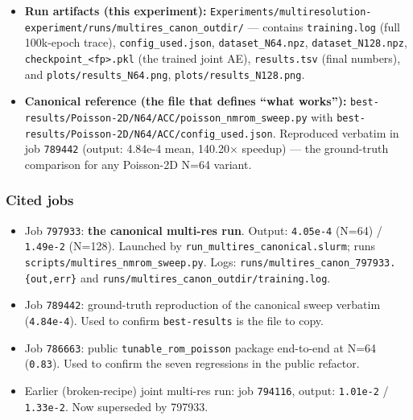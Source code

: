 \begin{itemize}
        $n_{\text{eq}}$=80, min\_eq=300, gn\_tol=1e-6, max\_iters=8).
  \item \textbf{Run artifacts (this experiment):}
        \texttt{Experiments/multiresolution-experiment/runs/multires\_canon\_outdir/}
        --- contains \texttt{training.log} (full 100k-epoch trace),
        \texttt{config\_used.json}, \texttt{dataset\_N64.npz},
        \texttt{dataset\_N128.npz}, \texttt{checkpoint\_<fp>.pkl} (the
        trained joint AE), \texttt{results.tsv} (final numbers), and
        \texttt{plots/results\_N64.png}, \texttt{plots/results\_N128.png}.
  \item \textbf{Canonical reference (the file that defines ``what works''):}
        \texttt{best-results/Poisson-2D/N64/ACC/poisson\_nmrom\_sweep.py}
        with \texttt{best-results/Poisson-2D/N64/ACC/config\_used.json}.
        Reproduced verbatim in job \texttt{789442} (output: 4.84e-4 mean,
        140.20$\times$ speedup) --- the ground-truth comparison for any
        Poisson-2D N=64 variant.
\end{itemize}

\subsubsection*{Cited jobs}
\begin{itemize}
  \item Job \texttt{797933}: \textbf{the canonical multi-res run}.
        Output: \texttt{4.05e-4} (N=64) / \texttt{1.49e-2} (N=128).
        Launched by \texttt{run\_multires\_canonical.slurm}; runs
        \texttt{scripts/multires\_nmrom\_sweep.py}.
        Logs: \texttt{runs/multires\_canon\_797933.\{out,err\}} and
        \texttt{runs/multires\_canon\_outdir/training.log}.
  \item Job \texttt{789442}: ground-truth reproduction of the canonical
        sweep verbatim (\texttt{4.84e-4}). Used to confirm
        \texttt{best-results} is the file to copy.
  \item Job \texttt{786663}: public \texttt{tunable\_rom\_poisson} package
        end-to-end at N=64 (\texttt{0.83}). Used to confirm the seven
        regressions in the public refactor.
  \item Earlier (broken-recipe) joint multi-res run: job \texttt{794116},
        output: \texttt{1.01e-2} / \texttt{1.33e-2}. Now superseded by 797933.
\end{itemize}

